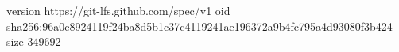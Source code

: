 version https://git-lfs.github.com/spec/v1
oid sha256:96a0c8924119f24ba8d5b1c37c4119241ae196372a9b4fc795a4d93080f3b424
size 349692
